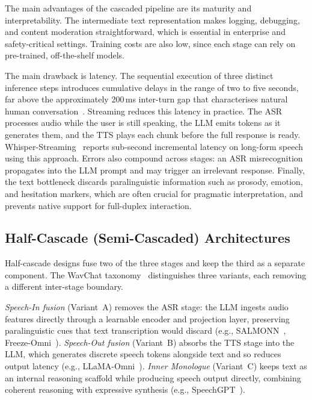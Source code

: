 The main advantages of the cascaded pipeline are its maturity and
interpretability. The intermediate text representation makes logging,
debugging, and content moderation straightforward, which is essential in
enterprise and safety-critical settings. Training costs are also low,
since each stage can rely on pre-trained, off-the-shelf models.

The main drawback is latency. The sequential execution of three distinct
inference steps introduces cumulative delays in the range of two to five
seconds, far above the approximately 200\,ms inter-turn gap that
characterises natural human conversation~\cite{heldner2010pauses}.
Streaming reduces this latency in practice. The ASR processes audio while
the user is still speaking, the LLM emits tokens as it generates them, and
the TTS plays each chunk before the full response is ready.
Whisper-Streaming~\cite{machacek2023whisper} reports sub-second incremental
latency on long-form speech using this approach. Errors also compound
across stages: an ASR misrecognition propagates into the LLM prompt and
may trigger an irrelevant response. Finally, the text bottleneck discards
paralinguistic information such as prosody, emotion, and hesitation
markers, which are often crucial for pragmatic interpretation, and prevents
native support for full-duplex interaction.

\subsection{Half-Cascade (Semi-Cascaded) Architectures}
\label{subsec:half-cascade}

Half-cascade designs fuse two of the three stages and keep the third as
a separate component. The WavChat taxonomy~\cite{ji2024wavechat}
distinguishes three variants, each removing a different inter-stage
boundary.

\emph{Speech-In fusion} (Variant~A) removes the ASR stage: the LLM
ingests audio features directly through a learnable encoder and projection
layer, preserving paralinguistic cues that text transcription would
discard (e.g., SALMONN~\cite{tang2024salmonn},
Freeze-Omni~\cite{wang2024freezeomni}). \emph{Speech-Out fusion}
(Variant~B) absorbs the TTS stage into the LLM, which generates discrete
speech tokens alongside text and so reduces output latency (e.g.,
LLaMA-Omni~\cite{fang2024llamaomni}). \emph{Inner Monologue} (Variant~C)
keeps text as an internal reasoning scaffold while producing speech output
directly, combining coherent reasoning with expressive synthesis (e.g.,
SpeechGPT~\cite{zhang2023speechgpt}).

